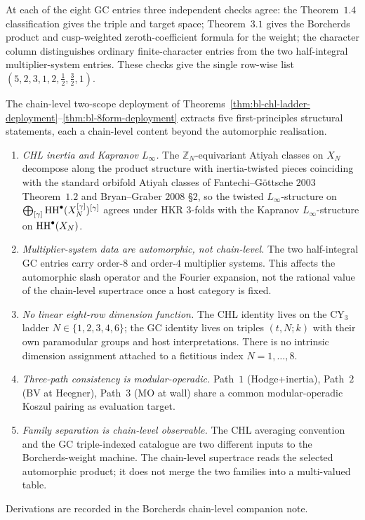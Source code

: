 \begin{remark}
\label{rem:bl-three-path-agreement-8form}
At each of the eight GC entries three independent checks agree: the
Theorem~$1.4$ classification gives the triple and target space;
Theorem~$3.1$ gives the Borcherds product and cusp-weighted
zeroth-coefficient formula for the weight; the character column
distinguishes ordinary finite-character entries from the two
half-integral multiplier-system entries. These checks give the single
row-wise list
$(5,2,3,1,2,\tfrac{1}{2},\tfrac{3}{2},1)$.
\end{remark}

\begin{remark}
\label{rem:bl-two-scope-structural-consequences}
The chain-level two-scope deployment of
Theorems~\ref{thm:bl-chl-ladder-deployment}--\ref{thm:bl-8form-deployment}
extracts five first-principles structural statements, each a
chain-level content beyond the automorphic realisation.
\begin{enumerate}[label=\textup{(G\arabic*)}]
 \item \emph{CHL inertia and Kapranov $L_\infty$.} The
 $\mathbb{Z}_N$-equivariant Atiyah classes on $X_N$ decompose along the
 product structure with inertia-twisted pieces coinciding with the
 standard orbifold Atiyah classes of Fantechi--G\"ottsche $2003$
 Theorem~$1.2$ and Bryan--Graber $2008$ \S$2$, so the twisted
 $L_\infty$-structure on $\bigoplus_{[\gamma]}
 \mathrm{HH}^\bullet(X_N^{[\gamma]})^{[\gamma]}$ agrees under HKR $3$-folds with
 the Kapranov $L_\infty$-structure on $\mathrm{HH}^\bullet(X_N)$.
 \item \emph{Multiplier-system data are automorphic, not chain-level.}
 The two half-integral GC entries carry order-$8$ and order-$4$
 multiplier systems. This affects the automorphic slash operator and
 the Fourier expansion, not the rational value of the chain-level
 supertrace once a host category is fixed.
 \item \emph{No linear eight-row dimension function.} The CHL identity
 lives on the CY$_3$ ladder $N \in \{1,2,3,4,6\}$; the GC identity lives
 on triples $(t,N;k)$ with their own paramodular groups and host
 interpretations. There is no intrinsic dimension assignment attached
 to a fictitious index $N=1,\ldots,8$.
 \item \emph{Three-path consistency is modular-operadic.} Path~$1$
 (Hodge+inertia), Path~$2$ (BV at Heegner), Path~$3$ (MO at wall)
 share a common modular-operadic Koszul pairing as evaluation target.
 \item \emph{Family separation is chain-level observable.} The CHL
 averaging convention and the GC triple-indexed catalogue are two
 different inputs to the Borcherds-weight machine. The chain-level
 supertrace reads the selected automorphic product; it does not merge
 the two families into a multi-valued table.
\end{enumerate}
Derivations are recorded in the Borcherds chain-level companion note.
\end{remark}

